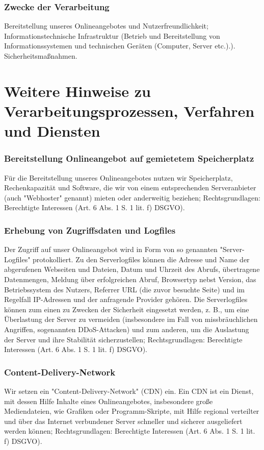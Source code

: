 \documentclass[12pt]{article}
\begin{document}
\section{Zwecke der Verarbeitung}
Bereitstellung unseres Onlineangebotes und Nutzerfreundlichkeit; Informationstechnische Infrastruktur (Betrieb und Bereitstellung von Informationssystemen und technischen Geräten (Computer, Server etc.).). Sicherheitsmaßnahmen.

\part{Weitere Hinweise zu Verarbeitungsprozessen, Verfahren und Diensten}
\section{Bereitstellung Onlineangebot auf gemietetem Speicherplatz}
Für die Bereitstellung unseres Onlineangebotes nutzen wir Speicherplatz, Rechenkapazität und Software, die wir von einem entsprechenden Serveranbieter (auch "Webhoster" genannt) mieten oder anderweitig beziehen; Rechtsgrundlagen: Berechtigte Interessen (Art. 6 Abs. 1 S. 1 lit. f) DSGVO).
\section{Erhebung von Zugriffsdaten und Logfiles}
Der Zugriff auf unser Onlineangebot wird in Form von so genannten "Server-Logfiles" protokolliert. Zu den Serverlogfiles können die Adresse und Name der abgerufenen Webseiten und Dateien, Datum und Uhrzeit des Abrufs, übertragene Datenmengen, Meldung über erfolgreichen Abruf, Browsertyp nebst Version, das Betriebssystem des Nutzers, Referrer URL (die zuvor besuchte Seite) und im Regelfall IP-Adressen und der anfragende Provider gehören. Die Serverlogfiles können zum einen zu Zwecken der Sicherheit eingesetzt werden, z. B., um eine Überlastung der Server zu vermeiden (insbesondere im Fall von missbräuchlichen Angriffen, sogenannten DDoS-Attacken) und zum anderen, um die Auslastung der Server und ihre Stabilität sicherzustellen; Rechtsgrundlagen: Berechtigte Interessen (Art. 6 Abs. 1 S. 1 lit. f) DSGVO).
\section{Content-Delivery-Network}
Wir setzen ein "Content-Delivery-Network" (CDN) ein. Ein CDN ist ein Dienst, mit dessen Hilfe Inhalte eines Onlineangebotes, insbesondere große Mediendateien, wie Grafiken oder Programm-Skripte, mit Hilfe regional verteilter und über das Internet verbundener Server schneller und sicherer ausgeliefert werden können; Rechtsgrundlagen: Berechtigte Interessen (Art. 6 Abs. 1 S. 1 lit. f) DSGVO).
\end{document}
